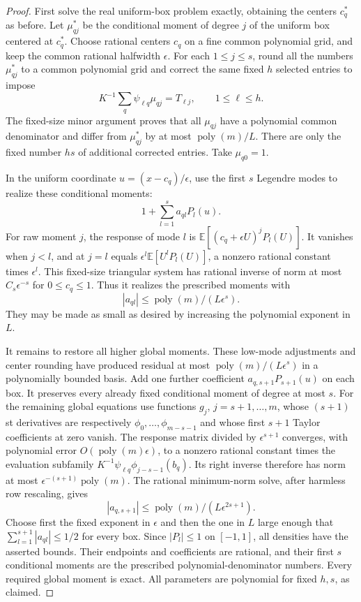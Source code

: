 \documentclass[11pt]{article}
\begin{document}
\begin{proof}
First solve the real uniform-box problem exactly, obtaining the centers
$c_q^*$ as before. Let $\mu_{qj}^*$ be the conditional moment of degree
$j$ of the uniform box centered at $c_q^*$. Choose rational centers
$c_q$ on a fine common polynomial grid, and keep the common rational
halfwidth $\epsilon$. For each $1\le j\le s$, round all the numbers
$\mu_{qj}^*$ to a common polynomial grid and correct the same fixed
$h$ selected entries to impose
\[
 K^{-1}\sum_q\psi_{\ell q}\mu_{qj}=T_{\ell j},\qquad1\le\ell\le h.
\]
The fixed-size minor argument proves that all $\mu_{qj}$ have a
polynomial common denominator and differ from $\mu_{qj}^*$ by at most
$\operatorname{poly}(m)/L$. There are only the fixed number $hs$ of
additional corrected entries. Take $\mu_{q0}=1$.

In the uniform coordinate $u=(x-c_q)/\epsilon$, use the first $s$
Legendre modes to realize these conditional moments:
\[
 1+\sum_{l=1}^s a_{ql}P_l(u).
\]
For raw moment $j$, the response of mode $l$ is
$\mathbb E[(c_q+\epsilon U)^jP_l(U)]$. It vanishes when $j<l$,
and at $j=l$ equals $\epsilon^l\mathbb E[U^lP_l(U)]$, a nonzero
rational constant times $\epsilon^l$. This fixed-size triangular
system has rational inverse of norm at most $C_s\epsilon^{-s}$
for $0\le c_q\le1$. Thus it realizes the prescribed moments with
\[
 |a_{ql}|\le\operatorname{poly}(m)/(L\epsilon^s).
\]
They may be made as small as desired by increasing the polynomial
exponent in $L$.

It remains to restore all higher global moments. These low-mode
adjustments and center rounding have produced residual at most
$\operatorname{poly}(m)/(L\epsilon^s)$ in a polynomially bounded
basis. Add one further coefficient $a_{q,s+1}P_{s+1}(u)$ on each box.
It preserves every already fixed conditional moment of degree at
most $s$. For the remaining global equations use functions $g_j$,
$j=s+1,\ldots,m$, whose $(s+1)$st derivatives are respectively
$\phi_0,\ldots,\phi_{m-s-1}$ and whose first $s+1$ Taylor coefficients
at zero vanish. The response matrix divided by $\epsilon^{s+1}$
converges, with polynomial error $O(\operatorname{poly}(m)\epsilon)$,
to a nonzero rational constant times the evaluation subfamily
$K^{-1}\psi_{\ell q}\phi_{j-s-1}(b_q)$. Its right inverse therefore
has norm at most $\epsilon^{-(s+1)}\operatorname{poly}(m)$.
The rational minimum-norm solve, after harmless row rescaling, gives
\[
 |a_{q,s+1}|\le\operatorname{poly}(m)/(L\epsilon^{2s+1}).
\]
Choose first the fixed exponent in $\epsilon$ and then the one in $L$
large enough that $\sum_{l=1}^{s+1}|a_{ql}|\le1/2$ for every box.
Since $|P_l|\le1$ on $[-1,1]$, all densities have the asserted bounds.
Their endpoints and coefficients are rational, and their first $s$
conditional moments are the prescribed polynomial-denominator numbers.
Every required global moment is exact. All parameters are polynomial
for fixed $h,s$, as claimed.
\end{proof}
\end{document}
